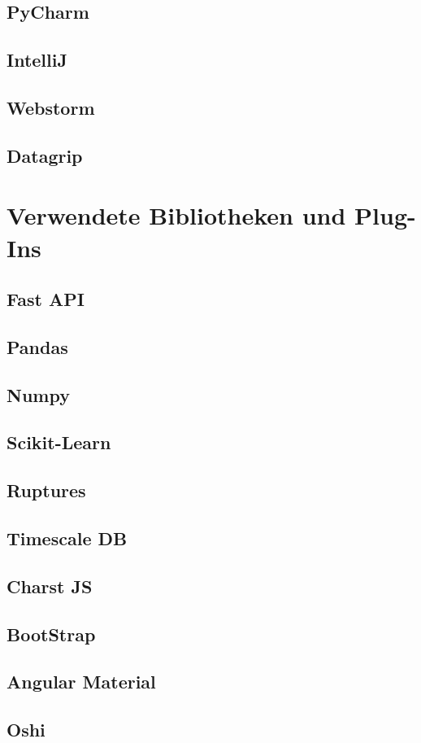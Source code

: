 \documentclass{report}
\begin{document}
\subsection{PyCharm}
\subsection{IntelliJ}
\subsection{Webstorm}
\subsection{Datagrip}
\section{Verwendete Bibliotheken und Plug-Ins}
\subsection{Fast API}
\subsection{Pandas}
\subsection{Numpy}
\subsection{Scikit-Learn}
\subsection{Ruptures}
\subsection{Timescale DB}
\subsection{Charst JS}
\subsection{BootStrap}
\subsection{Angular Material}
\subsection{Oshi}
\end{document}
